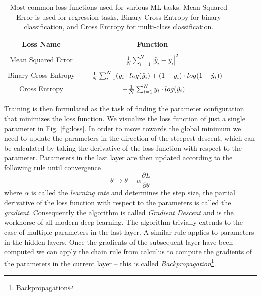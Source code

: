 \begin{table}
    \centering
    \renewcommand{\arraystretch}{1.3}
    \begin{tabular}{|c| c| c|}
    Loss Name & Function \\[0.5ex] \hline
    Mean Squared Error & $\begin{array} {lcl} \frac{1}{N} \sum_{i=1}^N|\hat{y}_i - y_i|^2\end{array}$  \\ [0.5ex]
    Binary Cross Entropy & $\begin{array} {r@{}l@{}} -\frac{1}{N} \sum_{i=1}^N (y_i \cdot log(\hat{y}_i) + (1 - y_i) \cdot log(1-\hat{y}_i)) \end{array}$ \\ [0.5ex]
    Cross Entropy & $\begin{array} {r@{}l@{}} -\frac{1}{N} \sum_{i=1}^N y_i \cdot log(\hat{y}_i) \end{array}$ \\ [0.5ex]
    \end{tabular}
    \caption{Most common loss functions used for various ML tasks. Mean Squared Error is used for regression tasks, Binary Cross Entropy for binary classification, and Cross Entropy for multi-class classification.}
    \label{table:losses}
\end{table}
Training is then formulated as the task of finding the parameter configuration that minimizes the loss function.
We visualize the loss function of just a single parameter in Fig. \ref{fig:loss}.
In order to move towards the global minimum we need to update the parameters in the direction of the steepest descent, which can be calculated by taking the derivative of the loss function with respect to the parameter.
Parameters in the last layer are then updated according to the following rule until convergence
\begin{equation}
    \label{eq:optimization}
    \theta \rightarrow \theta - \alpha \frac{\partial L}{\partial \theta}
\end{equation}
where $\alpha$ is called the \textit{learning rate} and determines the step size, the partial derivative of the loss function with respect to the parameters is called the \textit{gradient}.
Consequently the algorithm is called \textit{Gradient Descent} and is the workhorse of all modern deep learning.
The algorithm trivially extends to the case of multiple parameters in the last layer.
A similar rule applies to parameters in the hidden layers.
Once the gradients of the subsequent layer have been computed we can apply the chain rule from calculus to compute the gradients of the parameters in the current layer -- this is called \textit{Backpropagation}\footnote{Backpropagation}.

